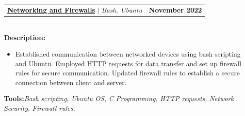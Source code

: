 \documentclass[letterpaper,11pt]{article}
\makeatletter
\newcommand{\resumeItem}[1]{
  \item\small{
    {#1 \vspace{-2pt}}
  }
}
\newcommand{\resumeProjectHeading}[2]{
    \item
    \begin{tabular*}{1.001\textwidth}{l@{\extracolsep{\fill}}r}
      \small#1 & \textbf{\small #2}\\
    \end{tabular*}\vspace{-7pt}
}
\newcommand{\resumeItemListStart}{\begin{itemize}}
\newcommand{\resumeItemListEnd}{\end{itemize}\vspace{-5pt}}
\makeatother
\begin{document}




                

\resumeProjectHeading
          {\textbf{\href{https://github.com/saiyakkshit?tab=repositories}{Networking and Firewalls}} $|$ \emph{Bash, Ubuntu \faGithub}}{November 2022}\\
          \vspace{6pt}
          \textbf{Description:}
           \vspace{-5pt}
          \resumeItemListStart
          \resumeItem{Established communication between networked devices using bash scripting and Ubuntu. Employed HTTP requests for data transfer and set up firewall rules for secure communication. Updated firewall rules to establish a secure connection between client and server.}
          \resumeItemListEnd 
          \textbf{Tools:}\emph{Bash scripting,
Ubuntu OS,
C Programming,
HTTP requests, Network Security,
Firewall rules.}
\end{document}
